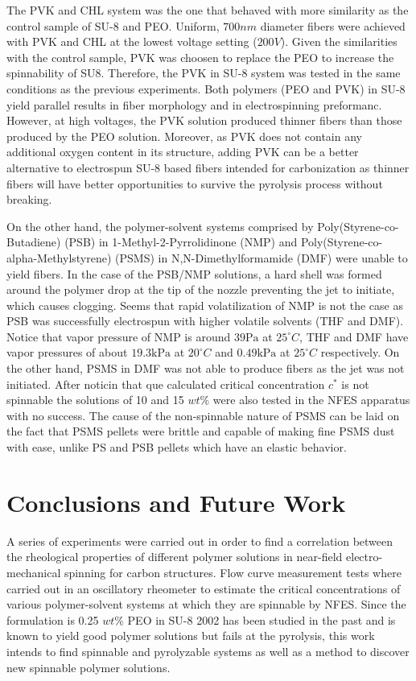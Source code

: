 The PVK and CHL system was the one that behaved with more similarity as the control sample of SU-8 and PEO. Uniform, $700 nm$ diameter fibers were achieved with PVK and CHL at the lowest voltage setting ($200 V$). Given the similarities with the control sample, PVK was choosen to replace the PEO to increase the spinnability of SU8. Therefore, the PVK in SU-8 system was tested in the same conditions as the previous experiments. Both polymers (PEO and PVK) in SU-8 yield parallel results in fiber morphology and in electrospinning preformanc. However, at high voltages, the PVK solution produced thinner fibers than those produced by the PEO solution. Moreover, as PVK does not contain any additional oxygen content in its structure, adding PVK can be a better alternative to electrospun SU-8 based fibers intended for carbonization as thinner fibers will have better opportunities to survive the pyrolysis process without breaking.

On the other hand, the polymer-solvent systems comprised by Poly(Styrene-co-Butadiene) (PSB) in 1-Methyl-2-Pyrrolidinone (NMP) and Poly(Styrene-co-alpha-Methylstyrene) (PSMS) in N,N-Dimethylformamide (DMF) were unable to yield fibers. In the case of the PSB/NMP solutions, a hard shell was formed around the polymer drop at the tip of the nozzle preventing the jet to initiate, which causes clogging. Seems that rapid volatilization of NMP is not the case as PSB was successfully electrospun with higher volatile solvents (THF and DMF). Notice that vapor pressure of NMP is around $39 \textrm{Pa}$ at $25^{\circ} C$, THF and DMF have vapor pressures of about $19.3 \textrm{kPa}$ at $20^{\circ} C$ and $0.49 \textrm{kPa}$ at $25^{\circ} C$ respectively. \cite{ICSCs} On the other hand, PSMS in DMF was not able to produce fibers as the jet was not initiated. After noticin that que calculated critical concentration $c^*$ is not spinnable the solutions of 10 and 15 $wt\%$ were also tested in the NFES apparatus with no success. The cause of the non-spinnable nature of PSMS can be laid on the fact that PSMS pellets were brittle and capable of making fine PSMS dust with ease, unlike PS and PSB pellets which have an elastic behavior.

\section{Conclusions and Future Work}

A series of experiments were carried out in order to find a correlation between the rheological properties of different polymer solutions in near-field electro-mechanical spinning for carbon structures. Flow curve measurement tests where carried out in an oscillatory rheometer to estimate the critical concentrations of various polymer-solvent systems at which they are spinnable by NFES. Since the formulation is 0.25 $wt\%$ PEO in SU-8 2002 has been studied in the past and is known to yield good polymer solutions but fails at the pyrolysis, this work intends to find spinnable and pyrolyzable systems as well as a method to discover new spinnable polymer solutions.

